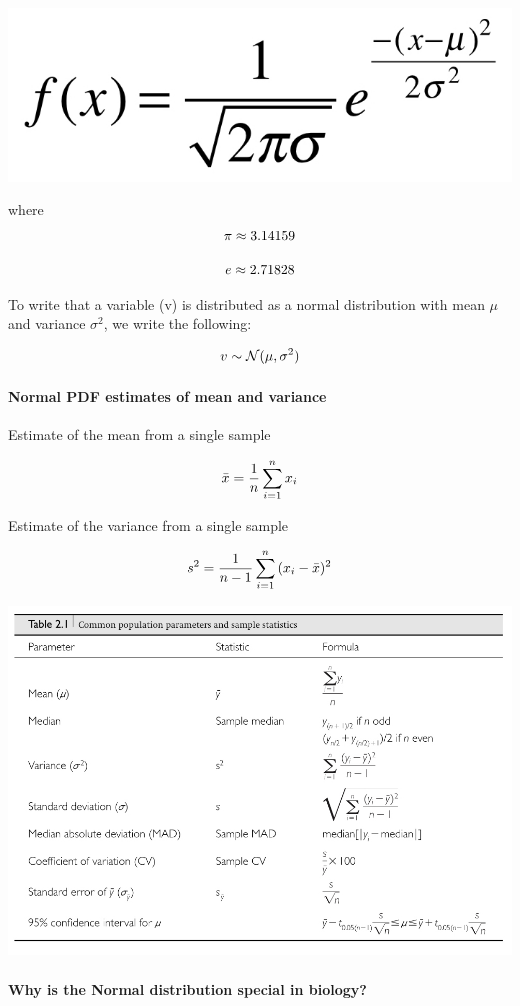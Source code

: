 \documentclass[]{book}
\let\oldparagraph\paragraph
\renewcommand{\paragraph}[1]{\oldparagraph{#1}\mbox{}}
\begin{document}
\begin{center}\includegraphics[width=0.4\linewidth]{images/week_2.032} \end{center}

where
\[\large \pi \approx 3.14159\]

\[\large e \approx 2.71828\]

To write that a variable (v) is distributed as a normal distribution with mean \(\mu\) and variance \(\sigma^2\), we write the following:

\[\large v \sim \mathcal{N} (\mu,\sigma^2)\]

\hypertarget{normal-pdf-estimates-of-mean-and-variance}{%
\paragraph{Normal PDF \textbar{} estimates of mean and variance}\label{normal-pdf-estimates-of-mean-and-variance}}

Estimate of the mean from a single sample

\[\Large \bar{x} = \frac{1}{n}\sum_{i=1}^{n}{x_i} \]

Estimate of the variance from a single sample

\[\Large s^2 = \frac{1}{n-1}\sum_{i=1}^{n}{(x_i - \bar{x})^2} \]

\begin{center}\includegraphics[width=0.9\linewidth]{images/week_2.010} \end{center}

\hypertarget{why-is-the-normal-distribution-special-in-biology}{%
\paragraph{Why is the Normal distribution special in biology?}\label{why-is-the-normal-distribution-special-in-biology}}
\end{document}
